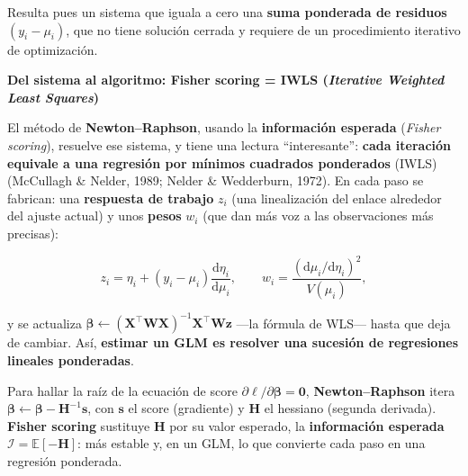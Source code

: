 \documentclass[
  letterpaper,
  DIV=11,
  numbers=noendperiod]{scrartcl}
\begin{document}
Resulta pues un sistema que iguala a cero una \textbf{suma ponderada de
residuos} \((y_i-\mu_i)\), que no tiene solución cerrada y requiere de
un procedimiento iterativo de optimización.

\textbf{Del sistema al algoritmo: Fisher scoring = IWLS (\emph{Iterative
Weighted Least Squares})}

El método de \textbf{Newton--Raphson}, usando la \textbf{información
esperada} (\emph{Fisher scoring}), resuelve ese sistema, y tiene una
lectura ``interesante'': \textbf{cada iteración equivale a una regresión
por mínimos cuadrados ponderados} (IWLS) (McCullagh \& Nelder, 1989;
Nelder \& Wedderburn, 1972). En cada paso se fabrican: una
\textbf{respuesta de trabajo} \(z_i\) (una linealización del enlace
alrededor del ajuste actual) y unos \textbf{pesos} \(w_i\) (que dan más
voz a las observaciones más precisas):

\[
z_i=\eta_i+(y_i-\mu_i)\frac{\mathrm{d}\eta_i}{\mathrm{d}\mu_i},
\qquad
w_i=\frac{(\mathrm{d}\mu_i/\mathrm{d}\eta_i)^2}{V(\mu_i)},
\]

y se actualiza
\(\boldsymbol\beta\leftarrow(\mathbf{X}^\top\mathbf{W}\mathbf{X})^{-1} \mathbf{X}^\top\mathbf{W}\mathbf{z}\)
---la fórmula de WLS--- hasta que deja de cambiar. Así, \textbf{estimar
un GLM es resolver una sucesión de regresiones lineales ponderadas}.

\begin{tcolorbox}[enhanced jigsaw, breakable, colframe=quarto-callout-note-color-frame, left=2mm, arc=.35mm, colbacktitle=quarto-callout-note-color!10!white, toprule=.15mm, colback=white, coltitle=black, rightrule=.15mm, opacitybacktitle=0.6, title=\textcolor{quarto-callout-note-color}{\faInfo}\hspace{0.5em}{Recordatorio: Newton--Raphson y Fisher scoring}, titlerule=0mm, toptitle=1mm, bottomtitle=1mm, leftrule=.75mm, bottomrule=.15mm, opacityback=0]

Para hallar la raíz de la ecuación de score
\(\partial\ell/\partial\boldsymbol\beta=\mathbf{0}\),
\textbf{Newton--Raphson} itera
\(\boldsymbol\beta\leftarrow\boldsymbol\beta-\mathbf{H}^{-1}\mathbf{s}\),
con \(\mathbf{s}\) el score (gradiente) y \(\mathbf{H}\) el hessiano
(segunda derivada). \textbf{Fisher scoring} sustituye \(\mathbf{H}\) por
su valor esperado, la \textbf{información esperada}
\(\mathcal{I}=\mathbb{E}[-\mathbf{H}]\): más estable y, en un GLM, lo
que convierte cada paso en una regresión ponderada.

\end{tcolorbox}
\end{document}
